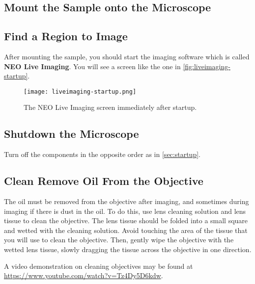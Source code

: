 \documentclass[10pt,a4paper,oneside]{book}
\begin{document}
\subsection{Mount the Sample onto the Microscope}

\subsection{Find a Region to Image}

After mounting the sample, you should start the imaging software which is called \textbf{NEO Live Imaging}. You will see a screen like the one in \autoref{fig:liveimaging-startup}.

\begin{figure}[ht]
    \centering
    \texttt{[image: liveimaging-startup.png]}
    \caption{The NEO Live Imaging screen immediately after startup.}
    \label{fig:liveimaging-startup}
\end{figure}

\subsection{Shutdown the Microscope}

Turn off the components in the opposite order as in \autoref{sec:startup}.

\subsection{Clean Remove Oil From the Objective}

The oil must be removed from the objective after imaging, and sometimes during imaging if there is dust in the oil. To do this, use lens cleaning solution and lens tissue to clean the objective. The lens tissue should be folded into a small square and wetted with the cleaning solution. Avoid touching the area of the tissue that you will use to clean the objective. Then, gently wipe the objective with the wetted lens tissue, slowly dragging the tissue across the objective in one direction.

A video demonstration on cleaning objectives may be found at \url{https://www.youtube.com/watch?v=Tz4Dy5D6kdw}.
\end{document}

